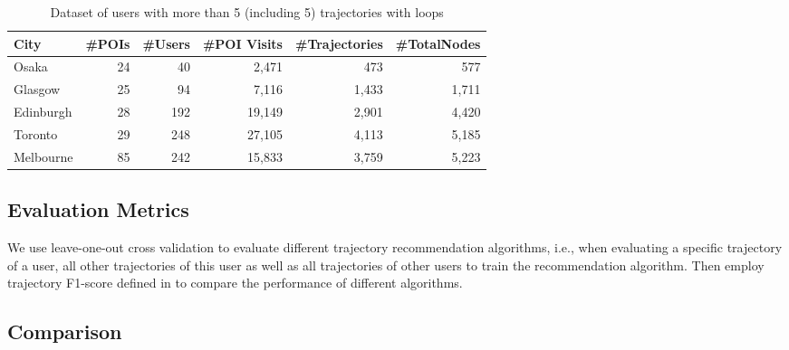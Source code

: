 \begin{table*}
\centering
\caption{Dataset of users with more than 5 (including 5) trajectories with loops}
\label{table:data:nofew}
\begin{tabular}{lrrrrr} \hline
\textbf{City} & \textbf{\#POIs} & \textbf{\#Users} & \textbf{\#POI Visits} & \textbf{\#Trajectories} & \textbf{\#TotalNodes} \\ \hline
Osaka & 24 & 40 & 2,471 & 473 & 577 \\ 
Glasgow & 25 & 94 & 7,116 & 1,433 & 1,711 \\ 
Edinburgh & 28 & 192 & 19,149 & 2,901 & 4,420 \\ 
Toronto & 29 & 248 & 27,105 & 4,113 & 5,185 \\ 
Melbourne & 85 & 242 & 15,833 & 3,759 & 5,223 \\ 
\hline
\end{tabular}
\end{table*}




\subsection{Evaluation Metrics}
\label{experiment:metric}
We use leave-one-out cross validation to evaluate different trajectory recommendation algorithms,
i.e., when evaluating a specific trajectory of a user, all other trajectories of this user as well as 
all trajectories of other users to train the recommendation algorithm.
Then employ trajectory F1-score defined in \cite{ijcai15} to compare the performance of different algorithms.


\subsection{Comparison}
\label{experiment:comparison}

